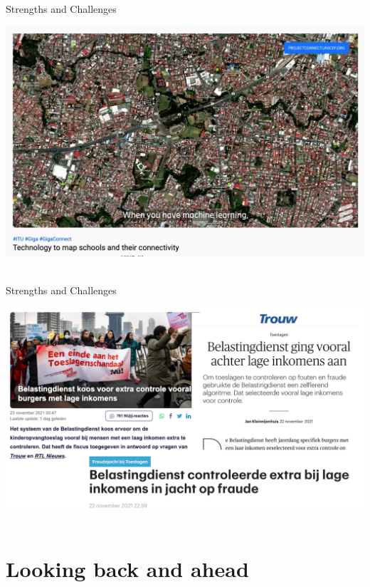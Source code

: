 \documentclass[handout]{beamer}
\begin{document}
\begin{frame}{Strengths and Challenges}
	
	
\begin{center}
	\includegraphics[width=\linewidth,height=\textheight,keepaspectratio]{../pictures/ericsson.png} \\\
\end{center}

\end{frame}
	


\begin{frame}{Strengths and Challenges}
	\begin{center}
		\includegraphics[width=\linewidth,height=\textheight,keepaspectratio]{../pictures/toeslagenaffaire_headlines.png} \\\
	\end{center}
	
	
\end{frame}


\section{Looking back and ahead}
\end{document}
